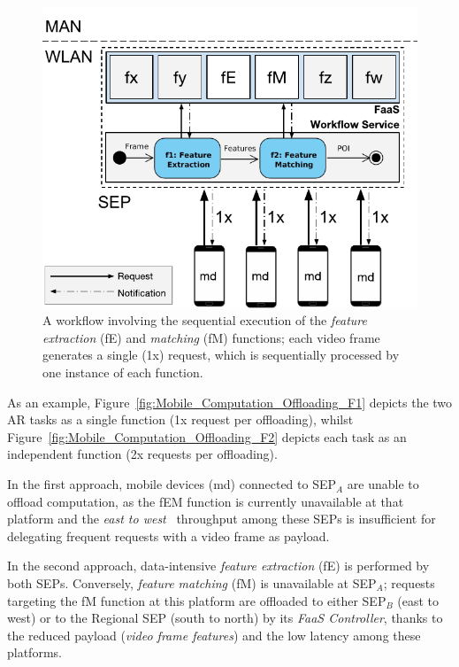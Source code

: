 \begin{figure}[tbp]
	\centering
	\includegraphics[width=1\linewidth]{Figs/Mobile_Computation_Offloading_Workflow.pdf}
	\caption{A workflow involving the sequential execution of the \textit{feature extraction} (fE) and \textit{matching} (fM) functions; each video frame generates a single (1x) request, which is sequentially processed by one instance of each function.} 
	\label{fig:Mobile_Computation_Offloading_Workflow}
\end{figure}
 
As an example, Figure~\ref{fig:Mobile_Computation_Offloading_F1} depicts the two AR tasks as a single function (1x request per offloading), whilst Figure~\ref{fig:Mobile_Computation_Offloading_F2} depicts each task as an independent function (2x requests per offloading). 

In the first approach, mobile devices (md) connected to SEP$_A$ are unable to offload computation, as the fEM function is currently unavailable at that platform and the \textit{east to west}~\cite{OpenFog:RA:2017} throughput among these SEPs is insufficient for delegating frequent requests with a video frame as payload.

In the second approach, data-intensive \textit{feature extraction} (fE) is performed by both SEPs. Conversely, \textit{feature matching} (fM) is unavailable at SEP$_A$; requests targeting the fM function at this platform are offloaded to either SEP$_B$ (east to west) or to the Regional SEP (south to north) by its \textit{FaaS Controller},
thanks to the reduced payload (\textit{video frame features}) and the low latency among these platforms. 

